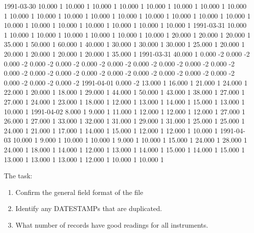 \begin{wideverbatim}
1991-03-30  10.000  1   10.000  1   10.000  1   10.000  1   10.000  1   10.000  1   10.000  1   10.000  1   10.000  1   10.000  1   10.000  1   10.000  1   10.000  1   10.000  1   10.000  1   10.000  1   10.000  1   10.000  1   10.000  1   10.000  1   10.000  1   10.000  1   10.000  1   10.000  1
1991-03-31  10.000  1   10.000  1   10.000  1   10.000  1   10.000  1   10.000  1   10.000  1   20.000  1   20.000  1   20.000  1   35.000  1   50.000  1   60.000  1   40.000  1   30.000  1   30.000  1   30.000  1   25.000  1   20.000  1   20.000  1   20.000  1   20.000  1   20.000  1   35.000  1
1991-03-31  40.000  1   0.000   -2  0.000   -2  0.000   -2  0.000   -2  0.000   -2  0.000   -2  0.000   -2  0.000   -2  0.000   -2  0.000   -2  0.000   -2  0.000   -2  0.000   -2  0.000   -2  0.000   -2  0.000   -2  0.000   -2  0.000   -2  0.000   -2  0.000   -2  0.000   -2  0.000   -2  0.000   -2
1991-04-01  0.000   -2  13.000  1   16.000  1   21.000  1   24.000  1   22.000  1   20.000  1   18.000  1   29.000  1   44.000  1   50.000  1   43.000  1   38.000  1   27.000  1   27.000  1   24.000  1   23.000  1   18.000  1   12.000  1   13.000  1   14.000  1   15.000  1   13.000  1   10.000  1
1991-04-02  8.000   1   9.000   1   11.000  1   12.000  1   12.000  1   12.000  1   27.000  1   26.000  1   27.000  1   33.000  1   32.000  1   31.000  1   29.000  1   31.000  1   25.000  1   25.000  1   24.000  1   21.000  1   17.000  1   14.000  1   15.000  1   12.000  1   12.000  1   10.000  1
1991-04-03  10.000  1   9.000   1   10.000  1   10.000  1   9.000   1   10.000  1   15.000  1   24.000  1   28.000  1   24.000  1   18.000  1   14.000  1   12.000  1   13.000  1   14.000  1   15.000  1   14.000  1   15.000  1   13.000  1   13.000  1   13.000  1   12.000  1   10.000  1   10.000  1
\end{wideverbatim}

The task:

\begin{enumerate}
\item
  Confirm the general field format of the file
\item
  Identify any DATESTAMPs that are duplicated.
\item
  What number of records have good readings for all instruments.
\end{enumerate}



